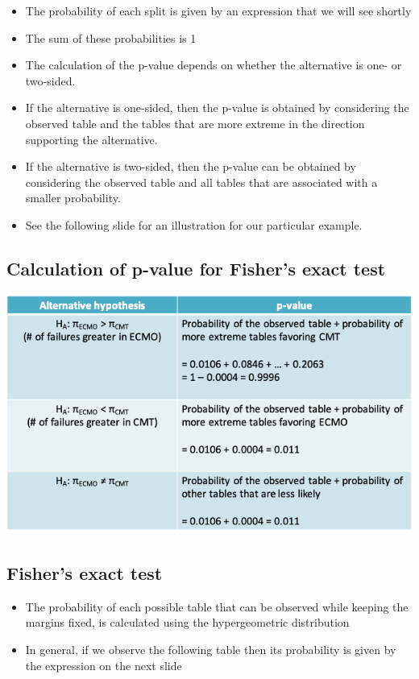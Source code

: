 \documentclass[
]{book}
\providecommand{\tightlist}{%
  \setlength{\itemsep}{0pt}\setlength{\parskip}{0pt}}
\begin{document}
\begin{itemize}
\tightlist
\item
  The probability of each split is given by an expression that we will see shortly
\item
  The sum of these probabilities is 1
\item
  The calculation of the p-value depends on whether the alternative is one- or two-sided.
\item
  If the alternative is one-sided, then the p-value is obtained by considering the observed table and the tables that are more extreme in the direction supporting the alternative.
\item
  If the alternative is two-sided, then the p-value can be obtained by considering the observed table and all tables that are associated with a smaller probability.
\item
  See the following slide for an illustration for our particular example.
\end{itemize}

\hypertarget{calculation-of-p-value-for-fishers-exact-test}{%
\subsection{Calculation of p-value for Fisher's exact test}\label{calculation-of-p-value-for-fishers-exact-test}}

\includegraphics[width=1\linewidth]{./8_54}

\hypertarget{fishers-exact-test-1}{%
\subsection{Fisher's exact test}\label{fishers-exact-test-1}}

\begin{itemize}
\tightlist
\item
  The probability of each possible table that can be observed while keeping the margins fixed, is calculated using the hypergeometric distribution
\item
  In general, if we observe the following table then its probability is given by the expression on the next slide
\end{itemize}
\end{document}
